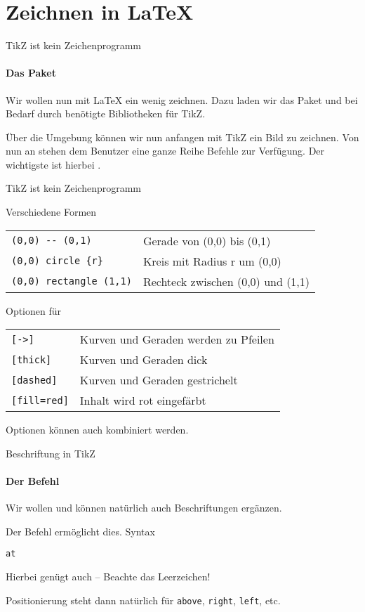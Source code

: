 \section{Zeichnen in \LaTeX}
\begin{frame}[fragile]{TikZ ist kein Zeichenprogramm}
\framesubtitle{Das Paket }
Wir wollen nun mit \LaTeX{} ein wenig zeichnen. Dazu laden wir das Paket  und bei Bedarf durch  benötigte Bibliotheken für TikZ. 

\medskip\pause
Über die Umgebung  können wir nun anfangen mit TikZ ein Bild zu zeichnen. Von nun an stehen dem Benutzer eine ganze Reihe Befehle zur Verfügung. Der wichtigste ist hierbei . 
\end{frame}

\begin{frame}[fragile]{TikZ ist kein Zeichenprogramm}
\begin{block}{Verschiedene Formen}
\begin{tabular}{ll}
\verb+(0,0) -- (0,1)+ & Gerade von (0,0) bis (0,1)\\
\verb+(0,0) circle {r}+ & Kreis mit Radius r um (0,0)\\
\verb+(0,0) rectangle (1,1)+ & Rechteck zwischen (0,0) und (1,1)
\end{tabular}
\end{block}
\begin{block}{Optionen für }
\begin{tabular}{ll}
\verb+[->]+ & Kurven und Geraden werden zu Pfeilen\\
\verb+[thick]+ & Kurven und Geraden dick\\
\verb+[dashed]+ & Kurven und Geraden gestrichelt\\
\verb+[fill=red]+ & Inhalt wird rot eingefärbt\\
\end{tabular}\pause

Optionen können auch kombiniert werden. 
\end{block}
\end{frame}

\begin{frame}[fragile]{Beschriftung in TikZ}
\framesubtitle{Der Befehl }
Wir wollen und können natürlich auch Beschriftungen ergänzen.

\medskip\pause
Der Befehl  ermöglicht dies. Syntax

\begin{center}
 \texttt{at}  
\end{center}

\medskip\pause
Hierbei genügt auch   -- Beachte das Leerzeichen! 

\medskip\pause
Positionierung steht dann natürlich für \texttt{above}, \texttt{right}, \texttt{left}, etc. 
\end{frame}

